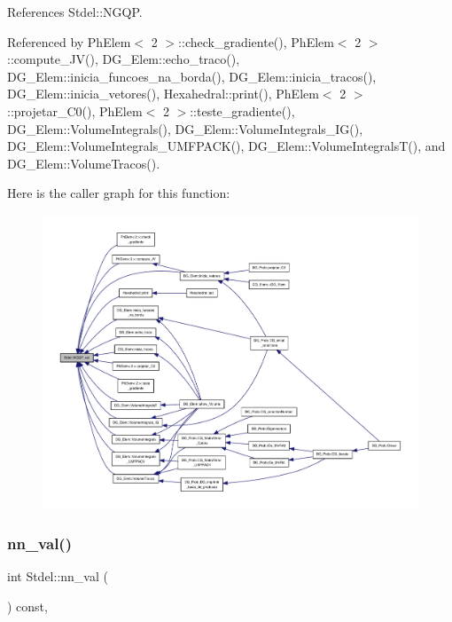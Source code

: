 References Stdel\+::\+N\+G\+QP.



Referenced by Ph\+Elem$<$ 2 $>$\+::check\+\_\+gradiente(), Ph\+Elem$<$ 2 $>$\+::compute\+\_\+\+J\+V(), D\+G\+\_\+\+Elem\+::echo\+\_\+traco(), D\+G\+\_\+\+Elem\+::inicia\+\_\+funcoes\+\_\+na\+\_\+borda(), D\+G\+\_\+\+Elem\+::inicia\+\_\+tracos(), D\+G\+\_\+\+Elem\+::inicia\+\_\+vetores(), Hexahedral\+::print(), Ph\+Elem$<$ 2 $>$\+::projetar\+\_\+\+C0(), Ph\+Elem$<$ 2 $>$\+::teste\+\_\+gradiente(), D\+G\+\_\+\+Elem\+::\+Volume\+Integrals(), D\+G\+\_\+\+Elem\+::\+Volume\+Integrals\+\_\+\+I\+G(), D\+G\+\_\+\+Elem\+::\+Volume\+Integrals\+\_\+\+U\+M\+F\+P\+A\+C\+K(), D\+G\+\_\+\+Elem\+::\+Volume\+Integrals\+T(), and D\+G\+\_\+\+Elem\+::\+Volume\+Tracos().

Here is the caller graph for this function\+:
\nopagebreak
\begin{figure}[H]
\begin{center}
\leavevmode
\includegraphics[width=350pt]{classStdel_a2f964819235e0a55fd60733518b592f2_icgraph}
\end{center}
\end{figure}
\mbox{\label{classStdel_a6086dceed8fe3dd410da0d6b84f02377}} 
\subsubsection{\texorpdfstring{nn\+\_\+val()}{nn\_val()}}
{\footnotesize\ttfamily int Stdel\+::nn\+\_\+val (\begin{DoxyParamCaption}{ }\end{DoxyParamCaption}) const\hspace{0.3cm}{\ttfamily [inline]}, {\ttfamily [inherited]}}



